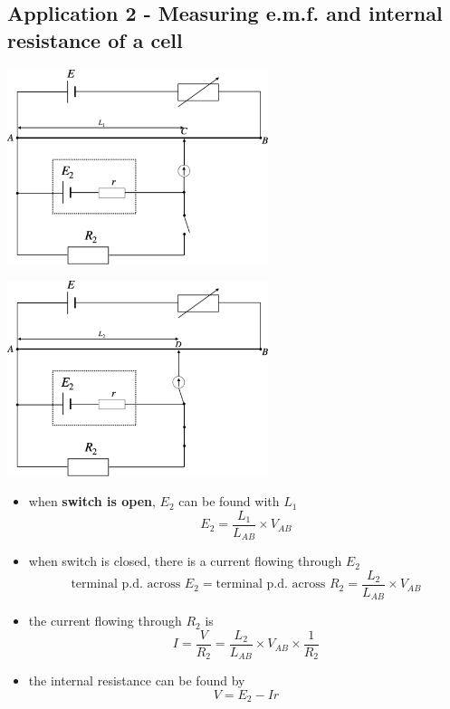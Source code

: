 \documentclass[a4paper, 10pt]{article}
\begin{document}
\subsection{Application 2 - Measuring e.m.f. and internal resistance of a cell}
\begin{minipage}{0.5\textwidth}
   \includegraphics[width=3in]{figures/6.pdf} 
\end{minipage}	
\begin{minipage}{0.5\textwidth}
   \includegraphics[width=3in]{figures/7.pdf} 
\end{minipage}	

\begin{itemize}
   \item when \textbf{switch is open}, $E_2$ can be found with $L_1$ 
      \[
         E_2 = \frac{L_{1}}{L_{AB}} \times V_{AB}
      \]
   \item when switch is closed, there is a current flowing through $E_2$
      \[
         \text{terminal p.d. across $E_2$} = \text{terminal p.d. across $R_2$} = \frac{L_2}{L_{AB}} \times V_{AB}
      \]
   \item the current flowing through $R_2$ is 
      \[
         I = \frac{V}{R_2} = \frac{L_2}{L_{AB}} \times V_{AB} \times \frac{1}{R_2}
      \]
   \item the internal resistance can be found by 
      \[
      V = E_2 - Ir
      \]
\end{itemize}	
\end{document}
